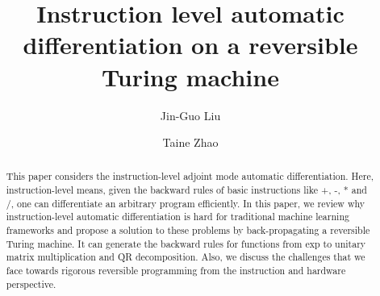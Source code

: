 \documentclass[aps,twocolumn,longbibliography,english,superscriptaddress]{revtex4-1}
\newcommand{\<}{\langle}
\renewcommand{\>}{\rangle}
\theoremstyle{definition}\newtheorem{definition}{\textit{Definition}}
\begin{document}
\title{Instruction level automatic differentiation on a reversible Turing machine}


\author{Jin-Guo Liu}

\author{Taine Zhao}

\begin{abstract}
    This paper considers the instruction-level adjoint mode automatic differentiation. Here, instruction-level means, given the backward rules of basic instructions like +, -, * and /, one can differentiate an arbitrary program efficiently. In this paper, we review why instruction-level automatic differentiation is hard for traditional machine learning frameworks and propose a solution to these problems by back-propagating a reversible Turing machine. It can generate the backward rules for functions from exp to unitary matrix multiplication and QR decomposition. Also, we discuss the challenges that we face towards rigorous reversible programming from the instruction and hardware perspective.
\end{abstract}


\maketitle

\end{document}
